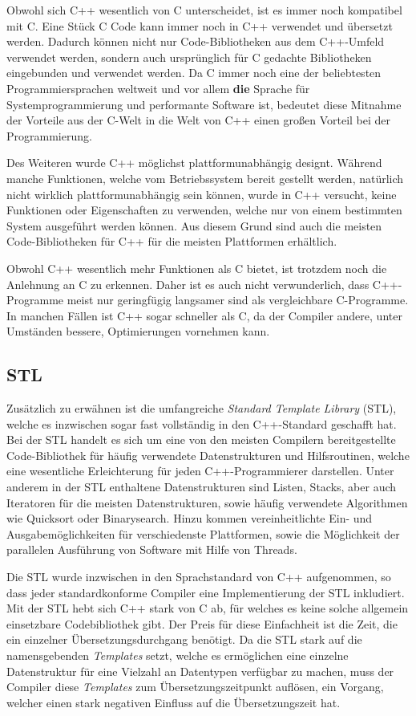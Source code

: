Obwohl sich C++ wesentlich von C unterscheidet, ist es immer noch kompatibel mit C. Eine Stück C Code kann immer noch in C++ verwendet und
übersetzt werden. Dadurch können nicht nur Code-Bibliotheken aus dem C++-Umfeld verwendet werden, sondern auch ursprünglich für C gedachte
Bibliotheken eingebunden und verwendet werden. Da C immer noch eine der beliebtesten Programmiersprachen weltweit und vor allem \textbf{die}
Sprache für Systemprogrammierung und performante Software ist, bedeutet diese Mitnahme der Vorteile aus der C-Welt in die Welt von C++
einen großen Vorteil bei der Programmierung.

Des Weiteren wurde C++ möglichst plattformunabhängig designt. Während manche Funktionen, welche vom Betriebssystem bereit gestellt werden, 
natürlich nicht wirklich plat\-tform\-un\-ab\-hän\-gig sein können, wurde in C++ versucht, keine Funktionen oder Eigenschaften zu verwenden, welche
nur von einem bestimmten System ausgeführt werden können. Aus diesem Grund sind auch die meisten Code-Bibliotheken für C++ für die meisten
Plattformen erhältlich. 

Obwohl C++ wesentlich mehr Funktionen als C bietet, ist trotzdem noch die Anlehnung an C zu erkennen. Daher ist es auch nicht verwunderlich, dass C++-Programme meist nur geringfügig langsamer sind als 
vergleichbare C-Programme. In manchen Fällen ist C++ sogar schneller als C, da der Compiler andere, unter Umständen bessere, Optimierungen vornehmen kann. 

\subsection{STL}
\label{sec:stl}
Zusätzlich zu erwähnen ist die umfangreiche \textit{Standard Template Library} (STL), welche es inzwischen sogar fast vollständig in den 
C++-Standard geschafft hat. Bei der STL handelt es sich um eine von den meisten Compilern bereitgestellte Code-Bibliothek für häufig 
verwendete Datenstrukturen und Hilfsroutinen, welche eine wesentliche Erleichterung für jeden C++-Programmierer darstellen. Unter anderem
in der STL enthaltene Datenstrukturen sind Listen, Stacks, aber auch Iteratoren für die meisten Datenstrukturen, sowie häufig verwendete Algorithmen
wie Quicksort oder Binarysearch. Hinzu kommen vereinheitlichte Ein- und Ausgabemöglichkeiten für verschiedenste Plattformen, sowie die 
Möglichkeit der parallelen Ausführung von Software mit Hilfe von Threads.

Die STL wurde inzwischen in den Sprachstandard von C++ aufgenommen, so dass jeder standardkonforme Compiler eine Implementierung der STL inkludiert. Mit der STL hebt sich C++ stark von C ab, für welches es keine solche allgemein einsetzbare Codebibliothek gibt. Der Preis für diese Einfachheit ist die Zeit, die ein einzelner Übersetzungsdurchgang benötigt. Da die STL stark auf die namensgebenden
\textit{Templates} setzt, welche es ermöglichen eine einzelne Datenstruktur für eine Vielzahl an Datentypen verfügbar zu machen, muss der Compiler diese \textit{Templates} zum Übersetzungszeitpunkt
auflösen, ein Vorgang, welcher einen stark negativen Einfluss auf die Übersetzungszeit hat.

